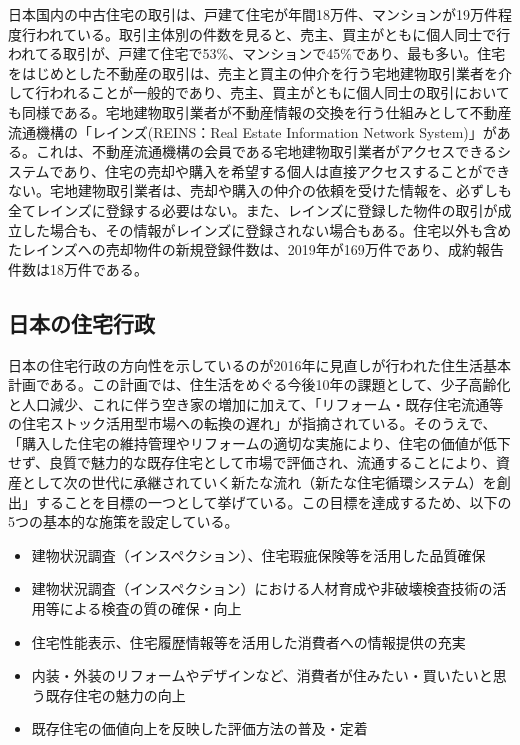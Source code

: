 \documentclass[a4paper,fontsize=11pt,report,notitlepage,line_length=38zw,number_of_lines=40,dvipdfmx]{jlreq}
\begin{document}
日本国内の中古住宅の取引は、戸建て住宅が年間18万件、マンションが19万件程度行われている。取引主体別の件数を見ると、売主、買主がともに個人同士で行われてる取引が、戸建て住宅で53\%、マンションで45\%であり、最も多い\cite{fudosantorihiki}。住宅をはじめとした不動産の取引は、売主と買主の仲介を行う宅地建物取引業者を介して行われることが一般的であり、売主、買主がともに個人同士の取引においても同様である。宅地建物取引業者が不動産情報の交換を行う仕組みとして不動産流通機構の「レインズ(REINS：Real Estate Information Network System)」がある。これは、不動産流通機構の会員である宅地建物取引業者がアクセスできるシステムであり、住宅の売却や購入を希望する個人は直接アクセスすることができない。宅地建物取引業者は、売却や購入の仲介の依頼を受けた情報を、必ずしも全てレインズに登録する必要はない。また、レインズに登録した物件の取引が成立した場合も、その情報がレインズに登録されない場合もある\cite{fudosanjoho}。住宅以外も含めたレインズへの売却物件の新規登録件数は、2019年が169万件であり、成約報告件数は18万件である\cite{shiteiryutsu}。

\subsection{日本の住宅行政}
日本の住宅行政の方向性を示しているのが2016年に見直しが行われた住生活基本計画である\cite{juseikatsu}。この計画では、住生活をめぐる今後10年の課題として、少子高齢化と人口減少、これに伴う空き家の増加に加えて、「リフォーム・既存住宅流通等の住宅ストック活用型市場への転換の遅れ」が指摘されている。そのうえで、「購入した住宅の維持管理やリフォームの適切な実施により、住宅の価値が低下せず、良質で魅力的な既存住宅として市場で評価され、流通することにより、資産として次の世代に承継されていく新たな流れ（新たな住宅循環システム）を創出」することを目標の一つとして挙げている。この目標を達成するため、以下の5つの基本的な施策を設定している。
\begin{itemize}
\item 建物状況調査（インスペクション）、住宅瑕疵保険等を活用した品質確保
\item 建物状況調査（インスペクション）における人材育成や非破壊検査技術の活用等による検査の質の確保・向上
\item 住宅性能表示、住宅履歴情報等を活用した消費者への情報提供の充実
\item 内装・外装のリフォームやデザインなど、消費者が住みたい・買いたいと思う既存住宅の魅力の向上
\item 既存住宅の価値向上を反映した評価方法の普及・定着
\end{itemize}
\end{document}
